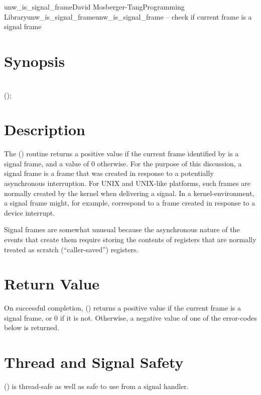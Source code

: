 \documentclass{article}
\begin{document}
\begin{Name}{3}{unw\_is\_signal\_frame}{David Mosberger-Tang}{Programming Library}{unw\_is\_signal\_frame}unw\_is\_signal\_frame -- check if current frame is a signal frame
\end{Name}

\section{Synopsis}

\\

 ();\\

\section{Description}

The () routine returns a positive value
if the current frame identified by  is a signal frame, and a
value of 0 otherwise.  For the purpose of this discussion, a signal
frame is a frame that was created in response to a potentially
asynchronous interruption.  For UNIX and UNIX-like platforms, such
frames are normally created by the kernel when delivering a signal.
In a kernel-environment, a signal frame might, for example, correspond
to a frame created in response to a device interrupt.

Signal frames are somewhat unusual because the asynchronous nature of
the events that create them require storing the contents of registers
that are normally treated as scratch (``caller-saved'') registers.

\section{Return Value}

On successful completion, () returns a
positive value if the current frame is a signal frame, or 0 if it is
not.  Otherwise, a negative value of one of the error-codes below is
returned.

\section{Thread and Signal Safety}

() is thread-safe as well as safe to use
from a signal handler.
\end{document}
